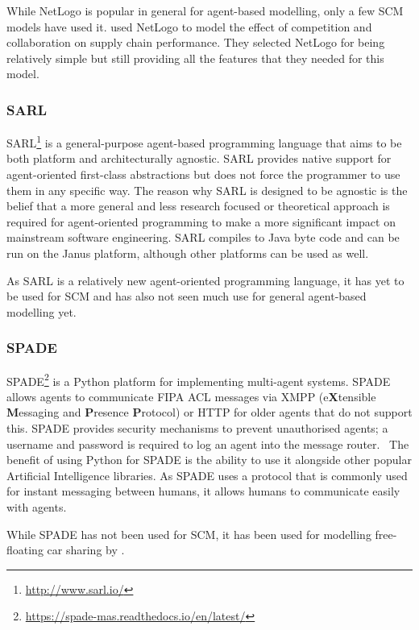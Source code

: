 While NetLogo is popular in general for agent-based modelling, only a few SCM models have used it.
 used NetLogo to model the effect of competition and collaboration on supply chain performance.
They selected NetLogo for being relatively simple but still providing all the features that they needed for this model.

\subsubsection{SARL}

SARL\footnote{\url{http://www.sarl.io/}} is a general-purpose agent-based programming language that aims to be both platform and architecturally agnostic.
SARL provides native support for agent-oriented first-class abstractions but does not force the programmer to use them in any specific way.
The reason why SARL is designed to be agnostic is the belief that a more general and less research focused or theoretical approach is required for agent-oriented programming to make a more significant impact on mainstream software engineering.
SARL compiles to Java byte code and can be run on the Janus platform, although other platforms can be used as well.~\cite{rodriguez2014sarl}

As SARL is a relatively new agent-oriented programming language, it has yet to be used for SCM and has also not seen much use for general agent-based modelling yet.

\subsubsection{SPADE}

SPADE\footnote{\url{https://spade-mas.readthedocs.io/en/latest/}} is a Python platform for implementing multi-agent systems.
SPADE allows agents to communicate FIPA ACL messages via XMPP (e\textbf{X}tensible \textbf{M}essaging and \textbf{P}resence \textbf{P}rotocol) or HTTP for older agents that do not support this.
SPADE provides security mechanisms to prevent unauthorised agents; a username and password is required to log an agent into the message router.~\cite{gregori2006jabber}
The benefit of using Python for SPADE is the ability to use it alongside other popular Artificial Intelligence libraries.
As SPADE uses a protocol that is commonly used for instant messaging between humans, it allows humans to communicate easily with agents.~\cite{palanca2020spade}

While SPADE has not been used for SCM, it has been used for modelling free-floating car sharing by .

